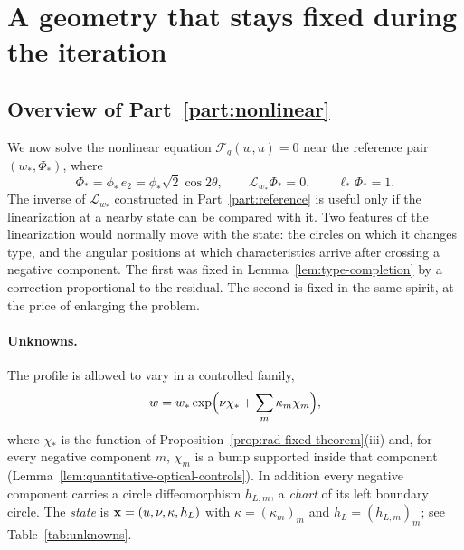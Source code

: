 \section{A geometry that stays fixed during the iteration}
\label{sec:fixed-geometry}
\label{sec:rosen-physical-grading}
\label{sec:optical-graph-height}
\label{sec:pp-positive-exact-poisson}

\subsection{Overview of Part~\ref{part:nonlinear}}
\label{subsec:part3-overview}

We now solve the nonlinear equation $\mathcal F_q(w,u)=0$ near the
reference pair $(w_*,\Phi_*)$, where
\[
 \Phi_*=\phi_*\,e_2=\phi_*\sqrt2\cos2\theta,\qquad
 \mathscr L_{w_*}\Phi_*=0,\qquad \ell_*\Phi_*=1 .
\]
The inverse of $\mathscr L_{w_*}$ constructed in
Part~\ref{part:reference} is useful only if the linearization at a
nearby state can be compared with it. Two features of the
linearization would normally move with the state: the circles on which
it changes type, and the angular positions at which characteristics
arrive after crossing a negative component. The first was fixed in
Lemma~\ref{lem:type-completion} by a correction proportional to the
residual. The second is fixed in the same spirit, at the price of
enlarging the problem.

\paragraph{Unknowns.}
The profile is allowed to vary in a controlled family,
\begin{equation}\label{eq:full-height-metric-controls}
 w=w_*\exp\Bigl(\nu\chi_*+\sum_m\kappa_m\chi_m\Bigr),
\end{equation}
where $\chi_*$ is the function of
Proposition~\ref{prop:rad-fixed-theorem}(iii) and, for every negative
component $m$, $\chi_m$ is a bump supported inside that component
(Lemma~\ref{lem:quantitative-optical-controls}). In addition every
negative component carries a circle diffeomorphism $h_{L,m}$, a
\emph{chart} of its left boundary circle. The \emph{state} is
$\mathbf x=(u,\nu,\kappa,h_L)$ with $\kappa=(\kappa_m)_m$ and
$h_L=(h_{L,m})_m$; see Table~\ref{tab:unknowns}.

